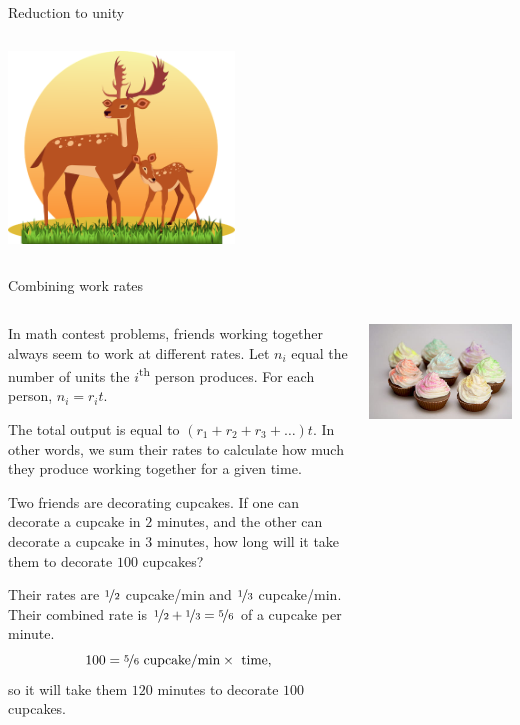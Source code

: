 \documentclass[9pt,aspectratio=169]{beamer}
\begin{document}
\begin{frame}{Reduction to unity}
\begin{columns}[T]
\begin{column}{0.5\textwidth}
      \centering 
      \includegraphics[width=0.45\textwidth]{09 - Rate/deer.png}
    \end{column}
  \end{columns}
\end{frame}

\begin{frame}{Combining work rates}
  \begin{columns}[T]
    \begin{column}{0.5\textwidth}
      In math contest problems, friends working together always seem to work at different rates.  Let $n_i$ equal the number of units the $i$\textsuperscript{th} person produces.  For each person, $n_i = r_i t$.
      \begin{definition}
        The total output is equal to $(r_1 + r_2  + r_3 + \ldots) t$.  In other words, we sum their rates to calculate how much they produce working together for a given time.
      \end{definition}
      \begin{problem}
        Two friends are decorating cupcakes.  If one can decorate a cupcake in $2$ minutes, and the other can decorate a cupcake in $3$ minutes, how long will it take them to decorate $100$ cupcakes?        
      \end{problem}
      Their rates are $\nicefrac{1}{2}$ cupcake/min and $\nicefrac{1}{3}$ cupcake/min.  Their combined rate is $\nicefrac{1}{2} + \nicefrac{1}{3} = \nicefrac{5}{6}$ of a cupcake per minute.  
      \[ 100 = \nicefrac{5}{6}\text{ cupcake/min} \times \text{ time}, \]
      so it will take them $120$ minutes to decorate $100$ cupcakes.
    \end{column}
    \begin{column}{0.5\textwidth}
      \includegraphics[width=\textwidth]{09 - Rate/cupcakes.jpg}

\end{column}
\end{columns}
\end{frame}
\end{document}
